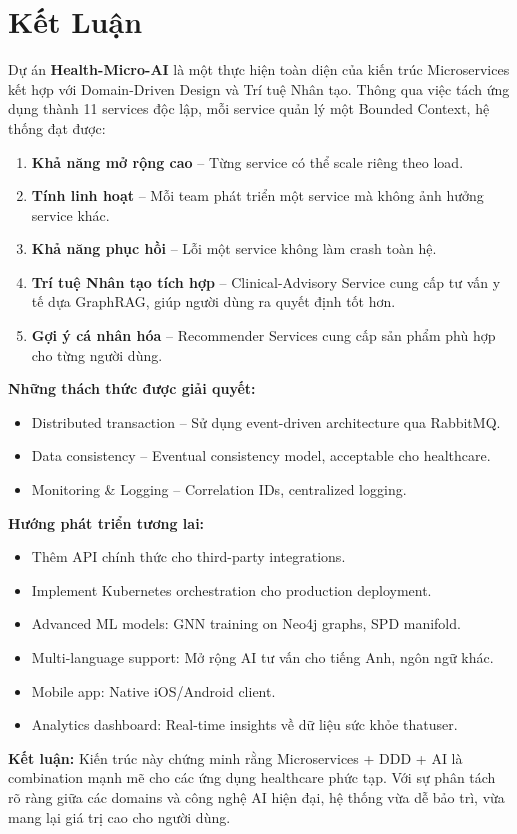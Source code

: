 \documentclass[12pt,a4paper]{article}
\begin{document}

\newpage
\section{Kết Luận}

Dự án \textbf{Health-Micro-AI} là một thực hiện toàn diện của kiến trúc Microservices kết hợp với Domain-Driven Design và Trí tuệ Nhân tạo. Thông qua việc tách ứng dụng thành 11 services độc lập, mỗi service quản lý một Bounded Context, hệ thống đạt được:

\begin{enumerate}
    \item \textbf{Khả năng mở rộng cao} – Từng service có thể scale riêng theo load.
    
    \item \textbf{Tính linh hoạt} – Mỗi team phát triển một service mà không ảnh hưởng service khác.
    
    \item \textbf{Khả năng phục hồi} – Lỗi một service không làm crash toàn hệ.
    
    \item \textbf{Trí tuệ Nhân tạo tích hợp} – Clinical-Advisory Service cung cấp tư vấn y tế dựa GraphRAG, giúp người dùng ra quyết định tốt hơn.
    
    \item \textbf{Gợi ý cá nhân hóa} – Recommender Services cung cấp sản phẩm phù hợp cho từng người dùng.
\end{enumerate}

\textbf{Những thách thức được giải quyết:}
\begin{itemize}
    \item Distributed transaction – Sử dụng event-driven architecture qua RabbitMQ.
    \item Data consistency – Eventual consistency model, acceptable cho healthcare.
    \item Monitoring & Logging – Correlation IDs, centralized logging.
\end{itemize}

\textbf{Hướng phát triển tương lai:}
\begin{itemize}
    \item Thêm API chính thức cho third-party integrations.
    \item Implement Kubernetes orchestration cho production deployment.
    \item Advanced ML models: GNN training on Neo4j graphs, SPD manifold.
    \item Multi-language support: Mở rộng AI tư vấn cho tiếng Anh, ngôn ngữ khác.
    \item Mobile app: Native iOS/Android client.
    \item Analytics dashboard: Real-time insights về dữ liệu sức khỏe thatuser.
\end{itemize}

\textbf{Kết luận:} Kiến trúc này chứng minh rằng Microservices + DDD + AI là combination mạnh mẽ cho các ứng dụng healthcare phức tạp. Với sự phân tách rõ ràng giữa các domains và công nghệ AI hiện đại, hệ thống vừa dễ bảo trì, vừa mang lại giá trị cao cho người dùng.
\end{document}
